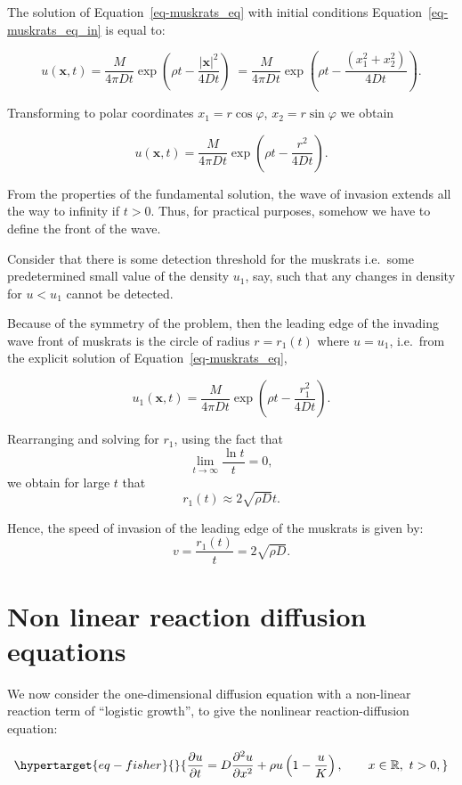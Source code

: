 \documentclass[
  letterpaper,
  DIV=11,
  numbers=noendperiod]{scrreprt}
\theoremstyle{definition}
\theoremstyle{plain}
\theoremstyle{plain}
\theoremstyle{remark}
\begin{document}
The solution of Equation~\ref{eq-muskrats_eq} with initial conditions
Equation~\ref{eq-muskrats_eq_in} is equal to:

\[
u({\mathbf{x}}, t) = \frac M{4 \pi D t} \exp \left(\rho t - \frac{ |{\mathbf{x}} |^2}{ 4Dt} \right)\; = \frac M{4 \pi D t} \exp \left(\rho t - \frac{ (x_{1}^{2} + x_{2}^{2})}{4Dt} \right).
\]

Transforming to polar coordinates \(x_1 = r \cos\varphi\),
\(x_2 = r \sin \varphi\) we obtain

\[
u({\mathbf{x}}, t) = \frac M{4 \pi D t} \exp \left(\rho t - \frac{ r^2}{ 4Dt} \right).
\]

From the properties of the fundamental solution, the wave of invasion
extends all the way to infinity if \(t>0\). Thus, for practical
purposes, somehow we have to define the front of the wave.

Consider that there is some detection threshold for the muskrats
i.e.~some predetermined small value of the density \(u_1\), say, such
that any changes in density for \(u <u_1\) cannot be detected.

Because of the symmetry of the problem, then the leading edge of the
invading wave front of muskrats is the circle of radius \(r=r_1(t)\)
where \(u=u_1\), i.e.~from the explicit solution of
Equation~\ref{eq-muskrats_eq},

\[
u_1({\mathbf{x}}, t) = \frac M{4 \pi D t} \exp \left(\rho t - \frac{ r_1^2}{ 4Dt} \right).
\]

Rearranging and solving for \(r_1\), using the fact that \[
\lim\limits_{t\to \infty} \dfrac {\ln t} t =0, 
\] we obtain for large \(t\) that \[
r_1(t) \approx 2 \sqrt{ \rho D} t.
\]

Hence, the speed of invasion of the leading edge of the muskrats is
given by: \[
v = \frac{r_1(t)}{t} =  2 \sqrt{ \rho D}. 
\]

\hypertarget{non-linear-reaction-diffusion-equations}{%
\chapter{Non linear reaction diffusion
equations}\label{non-linear-reaction-diffusion-equations}}

We now consider the one-dimensional diffusion equation with a non-linear
reaction term of ``logistic growth'', to give the nonlinear
reaction-diffusion equation:

\begin{equation}\protect\hypertarget{eq-fisher}{}{
\frac{\partial u}{\partial t} = D\frac{\partial^2 u}{\partial x^2} +   \rho u\left(1-\frac u K\right), \qquad x\in \mathbb R, \, \, t >0,  
}\label{eq-fisher}\end{equation}
\end{document}

